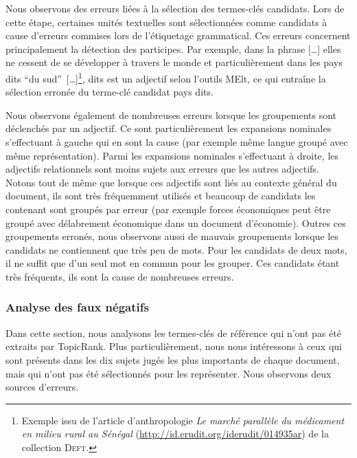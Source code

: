 
          Nous observons des erreurs liées à la sélection des termes-clés
          candidats. Lors de cette étape, certaines unités textuelles sont
          sélectionnées comme candidats à cause d'erreurs commises lors de
          l'étiquetage grammatical. Ces erreurs concernent principalement la
          détection des participes. Par exemple, dans la phrase \og{}[\dots]
          elles ne cessent de se développer à travers le monde et
          particulièrement dans les pays dits ``du
          sud''~[\dots]\fg{}\footnote{Exemple issu de l'article d'anthropologie
          \textit{Le marché parallèle du médicament en milieu rural au Sénégal}
          (\url{http://id.erudit.org/iderudit/014935ar}) de la collection
          \textsc{Deft}.}, \og{}dits\fg{} est un adjectif selon l'outils MElt, ce qui
          entraîne la sélection erronée du terme-clé candidat \og{}pays
          dits\fg{}.

          Nous observons également de nombreuses erreurs lorsque les groupements
          sont déclenchés par un adjectif. Ce sont particulièrement les
          expansions nominales s'effectuant à gauche qui en sont la cause (par
          exemple \og{}même langue\fg{} groupé avec \og{}même
          représentation\fg{}). Parmi les expansions nominales s'effectuant à
          droite, les adjectifs relationnels sont moins sujets aux erreurs que
          les autres adjectifs. Notons tout de même que lorsque ces adjectifs
          sont liés au contexte général du document, ils sont très fréquemment
          utilisés et beaucoup de candidats les contenant sont groupés par
          erreur (par exemple \og{}forces économiques\fg{} peut être groupé
          avec \og{}délabrement économique\fg{} dans un document d'économie).
          Outres ces groupements erronés, nous observons aussi de mauvais
          groupements lorsque les candidats ne contiennent que très peu de mots.
          Pour les candidats de deux mots, il ne suffit que d'un seul mot en
          commun pour les grouper. Ces candidats étant très fréquents, ils sont
          la cause de nombreuses erreurs.

        \subsubsection{Analyse des faux négatifs}
        \label{subsubsec:main:domain_independent_keyphrase_extraction-unsupervised_automatic_keyphrase_extraction-error_analysis-false_negatives}
          Dans cette section, nous analysons les termes-clés de référence qui
          n'ont pas été extraits par TopicRank. Plus particulièrement, nous nous
          intéressons à ceux qui sont présents dans les dix sujets jugés les
          plus importants de chaque document, mais qui n'ont pas été
          sélectionnés pour les représenter. Nous observons deux sources
          d'erreurs.


